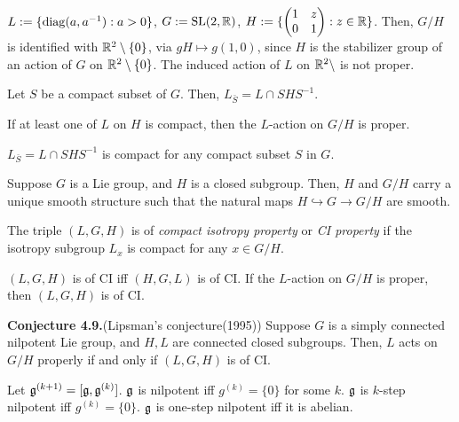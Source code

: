 \documentclass{../../../small}
\begin{document}
\setcounter{thm}{1}

\begin{ex}
$L:=\{\operatorname{diag}(a,a^{-1}):a>0\}$, $G:=\mathrm{SL}(2,\mathbb{R})$, $H:=\{\begin{pmatrix}1&z\\0&1\end{pmatrix}:z\in\mathbb{R}\}$.
Then, $G/H$ is identified with $\mathbb{R}^2\setminus\{0\}$, via $gH\mapsto g(1,0)$, since $H$ is the stabilizer group of an action of $G$ on $\mathbb{R}^2\setminus\{0\}$.
The induced action of $L$ on $\mathbb{R}^2\setminus$ is not proper.
\end{ex}

\begin{lem}
Let $S$ be a compact subset of $G$.
Then, $L_{\bar S}=L\cap SHS^{-1}$.
\end{lem}
\begin{prop}
If at least one of $L$ on $H$ is compact, then the $L$-action on $G/H$ is proper.
\end{prop}
\begin{pf}
$L_{\bar S}=L\cap SHS^{-1}$ is compact for any compact subset $S$ in $G$.
\end{pf}

\begin{thm}
Suppose $G$ is a Lie group, and $H$ is a closed subgroup.
Then, $H$ and $G/H$ carry a unique smooth structure such that the natural maps $H\hookrightarrow G\to G/H$ are smooth.
\end{thm}
\begin{ex}

\end{ex}

\begin{defn}
The triple $(L,G,H)$ is of \emph{compact isotropy property} or \emph{CI property} if the isotropy subgroup $L_x$ is compact for any $x\in G/H$.
\end{defn}
\begin{prop}
$(L,G,H)$ is of CI iff $(H,G,L)$ is of CI.
If the $L$-action on $G/H$ is proper, then $(L,G,H)$ is of CI.
\end{prop}

\setcounter{thm}{9}
\noindent\textbf{Conjecture 4.9.}(Lipsman's conjecture(1995)) Suppose $G$ is a simply connected nilpotent Lie group, and $H,L$ are connected closed subgroups.
Then, $L$ acts on $G/H$ properly if and only if $(L,G,H)$ is of CI.

\begin{defn}
Let $\mathfrak{g}^{(k+1)}=[\mathfrak{g},\mathfrak{g}^{(k)}]$.
$\mathfrak{g}$ is nilpotent iff $g^{(k)}=\{0\}$ for some $k$.
$\mathfrak{g}$ is $k$-step nilpotent iff $g^{(k)}=\{0\}$.
$\mathfrak{g}$ is one-step nilpotent iff it is abelian.
\end{defn}
\end{document}
